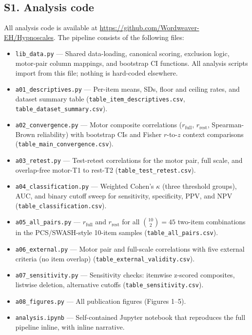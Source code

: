 \documentclass[12pt,a4paper]{article}
\begin{document}
\subsection*{S1. Analysis code}

All analysis code is available at
\url{https://github.com/Wordweaver-EH/Hypnoscales}.
The pipeline consists of the following files:

\begin{itemize}
  \item \texttt{lib\_data.py} --- Shared data-loading, canonical scoring,
    exclusion logic, motor-pair column mappings, and bootstrap CI functions.
    All analysis scripts import from this file; nothing is hard-coded
    elsewhere.
  \item \texttt{a01\_descriptives.py} --- Per-item means, SDs, floor and
    ceiling rates, and dataset summary table
    (\texttt{table\_item\_descriptives.csv},
    \texttt{table\_dataset\_summary.csv}).
  \item \texttt{a02\_convergence.py} --- Motor composite correlations
    ($r_{\text{full}}$, $r_{\text{rest}}$, Spearman-Brown reliability) with
    bootstrap CIs and Fisher $r$-to-$z$ context comparisons
    (\texttt{table\_main\_convergence.csv}).
  \item \texttt{a03\_retest.py} --- Test-retest correlations for the motor
    pair, full scale, and overlap-free motor-T1 to rest-T2
    (\texttt{table\_test\_retest.csv}).
  \item \texttt{a04\_classification.py} --- Weighted Cohen's $\kappa$
    (three threshold groups), AUC, and binary cutoff sweep for sensitivity, specificity,
    PPV, and NPV (\texttt{table\_classification.csv}).
  \item \texttt{a05\_all\_pairs.py} --- $r_{\text{full}}$ and
    $r_{\text{rest}}$ for all $\binom{10}{2} = 45$ two-item combinations in
    the PCS/SWASH-style 10-item samples
    (\texttt{table\_all\_pairs.csv}).
  \item \texttt{a06\_external.py} --- Motor pair and full-scale correlations
    with five external criteria (no item overlap)
    (\texttt{table\_external\_validity.csv}).
  \item \texttt{a07\_sensitivity.py} --- Sensitivity checks: itemwise
    z-scored composites, listwise deletion, alternative cutoffs
    (\texttt{table\_sensitivity.csv}).
  \item \texttt{a08\_figures.py} --- All publication figures (Figures 1--5).
  \item \texttt{analysis.ipynb} --- Self-contained Jupyter notebook that
    reproduces the full pipeline inline, with inline narrative.
\end{itemize}
\end{document}
